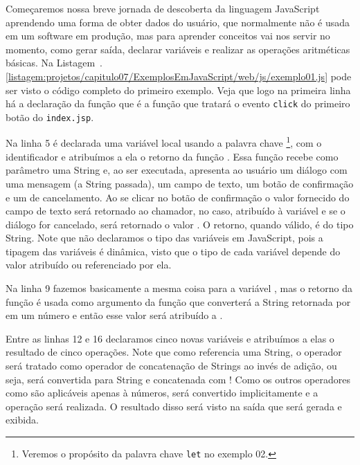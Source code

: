 Começaremos nossa breve jornada de descoberta da linguagem JavaScript aprendendo uma forma de obter dados do usuário, que normalmente não é usada em um software em produção, mas para aprender conceitos vai nos servir no momento, como gerar saída, declarar variáveis e realizar as operações aritméticas básicas. Na Listagem~\thechapter.\ref{listagem:projetos/capitulo07/ExemplosEmJavaScript/web/js/exemplo01.js} pode ser visto o código completo do primeiro exemplo. Veja que logo na primeira linha há a declaração da função  que é a função que tratará o evento \texttt{click} do primeiro botão do \texttt{index.jsp}.


Na linha 5 é declarada uma variável local usando a palavra chave \footnote{Veremos o propósito da palavra chave \texttt{let} no exemplo 02.}, com o identificador  e atribuímos a ela o retorno da função . Essa função recebe como parâmetro uma String e, ao ser executada, apresenta ao usuário um diálogo com uma mensagem (a String passada), um campo de texto, um botão de confirmação e um de cancelamento. Ao se clicar no botão de confirmação o valor fornecido do campo de texto será retornado ao chamador, no caso, atribuído à variável  e se o diálogo for cancelado, será retornado o valor . O retorno, quando válido, é do tipo String. Note que não declaramos o tipo das variáveis em JavaScript, pois a tipagem das variáveis é dinâmica, visto que o tipo de cada variável depende do valor atribuído ou referenciado por ela.

Na linha 9 fazemos basicamente a mesma coisa para a variável , mas o retorno da função  é usada como argumento da função  que converterá a String retornada por  em um número e então esse valor será atribuído a .

Entre as linhas 12 e 16 declaramos cinco novas variáveis e atribuímos a elas o resultado de cinco operações. Note que como  referencia uma String, o operador \inlineJavaScriptCode{+} será tratado como operador de concatenação de Strings ao invés de adição, ou seja,  será convertida para String e concatenada com ! Como os outros operadores como são aplicáveis apenas à números,  será convertido implicitamente e a operação será realizada. O resultado disso será visto na saída que será gerada e exibida.

